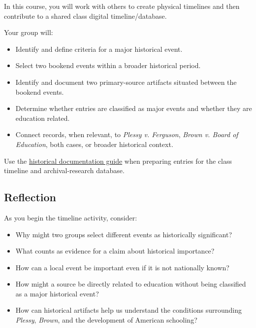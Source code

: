 \documentclass[
  letterpaper,
  DIV=11,
  numbers=noendperiod]{scrartcl}
\providecommand{\tightlist}{%
  \setlength{\itemsep}{0pt}\setlength{\parskip}{0pt}}\usepackage{longtable,booktabs,array}
\begin{document}
In this course, you will work with others to create physical timelines
and then contribute to a shared class digital timeline/database.

Your group will:

\begin{itemize}
\tightlist
\item
  Identify and define criteria for a major historical event.
\item
  Select two bookend events within a broader historical period.
\item
  Identify and document two primary-source artifacts situated between
  the bookend events.
\item
  Determine whether entries are classified as major events and whether
  they are education related.
\item
  Connect records, when relevant, to \emph{Plessy v. Ferguson},
  \emph{Brown v. Board of Education}, both cases, or broader historical
  context.
\end{itemize}

\begin{tcolorbox}[enhanced jigsaw, colframe=quarto-callout-note-color-frame, rightrule=.15mm, opacitybacktitle=0.6, leftrule=.75mm, colback=white, breakable, coltitle=black, arc=.35mm, bottomrule=.15mm, titlerule=0mm, left=2mm, colbacktitle=quarto-callout-note-color!10!white, title=\textcolor{quarto-callout-note-color}{\faInfo}\hspace{0.5em}{Documentation guide}, toprule=.15mm, bottomtitle=1mm, toptitle=1mm, opacityback=0]

Use the \href{../documentation.qmd}{historical documentation guide} when
preparing entries for the class timeline and archival-research database.

\end{tcolorbox}

\subsection{Reflection}\label{reflection}

As you begin the timeline activity, consider:

\begin{itemize}
\tightlist
\item
  Why might two groups select different events as historically
  significant?
\item
  What counts as evidence for a claim about historical importance?
\item
  How can a local event be important even if it is not nationally known?
\item
  How might a source be directly related to education without being
  classified as a major historical event?
\item
  How can historical artifacts help us understand the conditions
  surrounding \emph{Plessy}, \emph{Brown}, and the development of
  American schooling?
\end{itemize}
\end{document}
